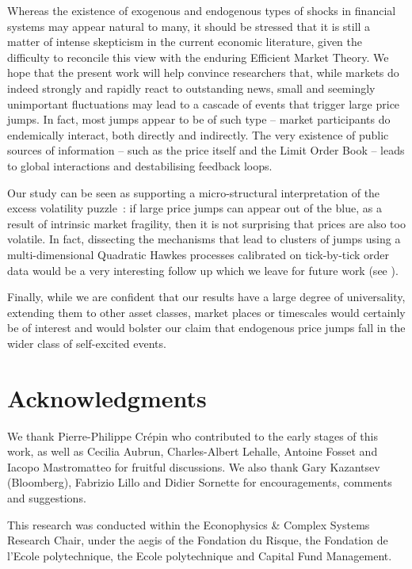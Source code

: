 \documentclass[amsmath,amssymb,aps,pre,floatfix,twocolumn,superscriptaddress]{revtex4}
\begin{document}
Whereas the existence of exogenous and endogenous types of shocks in financial systems may appear natural to many, it should be stressed that it is still a matter of intense skepticism in the current economic literature, given the difficulty to reconcile this view with the enduring Efficient Market Theory. We hope that the present work will help convince researchers that, while markets do indeed strongly and rapidly react to outstanding news, small and seemingly unimportant fluctuations may lead to a cascade of events that trigger large price jumps. In fact, most jumps appear to be of such type -- market participants do endemically interact, both directly and indirectly. The very existence of public sources of information -- such as the price itself and the Limit Order Book -- leads to global interactions and destabilising feedback loops. 

Our study can be seen as supporting a micro-structural interpretation of the excess volatility puzzle~\cite{shiller}: if large price jumps can appear out of the blue, as a result of intrinsic market fragility, then it is not surprising that prices are also too volatile. In fact, dissecting the mechanisms that lead to clusters of jumps using a multi-dimensional Quadratic Hawkes processes calibrated on tick-by-tick order data would be a very interesting follow up which we leave for future work (see \cite{fosset2021calibration}). 

Finally, while we are confident that our results have a large degree of universality, extending them to other asset classes, market places or timescales would certainly be of interest and would bolster our claim that endogenous price jumps fall in the wider class of self-excited events.  

\section*{Acknowledgments}

We thank Pierre-Philippe Cr\'epin who contributed to the early stages of this work, as well as Cecilia Aubrun, Charles-Albert Lehalle, Antoine Fosset and Iacopo Mastromatteo for fruitful discussions. We also thank Gary Kazantsev (Bloomberg), Fabrizio Lillo and Didier Sornette for encouragements, comments and suggestions.

This research was conducted within the Econophysics \& Complex Systems Research Chair, under the aegis of the Fondation du Risque, the Fondation de l’Ecole polytechnique, the Ecole polytechnique and Capital Fund Management.
\end{document}
